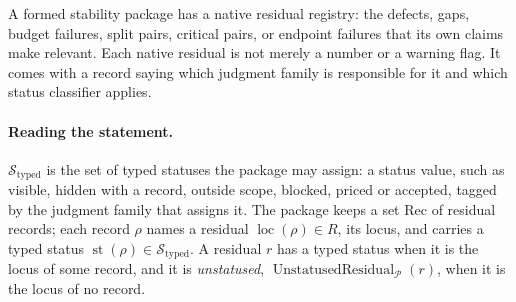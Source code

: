 A formed stability package has a native residual registry: the
defects, gaps, budget failures, split pairs, critical pairs, or
endpoint failures that its own claims make relevant.  Each native
residual is not merely a number or a warning flag.  It comes with a
record saying which judgment family is responsible for it and which
status classifier applies.

\paragraph{Reading the statement.}
\(\mathcal S_{\mathrm{typed}}\) is the set of typed statuses the package
may assign: a status value, such as visible, hidden with a record, outside scope,
blocked, priced or accepted, tagged by the judgment family that assigns it.
The package keeps a set \(\mathrm{Rec}\) of residual records; each record
\(\rho\) names a residual \(\operatorname{loc}(\rho)\in R\), its locus, and
carries a typed status \(\operatorname{st}(\rho)\in\mathcal S_{\mathrm{typed}}\).
A residual \(r\) has a typed status when it is the locus of some record, and
it is \emph{unstatused}, \(\operatorname{UnstatusedResidual}_{\mathcal P}(r)\),
when it is the locus of no record.

